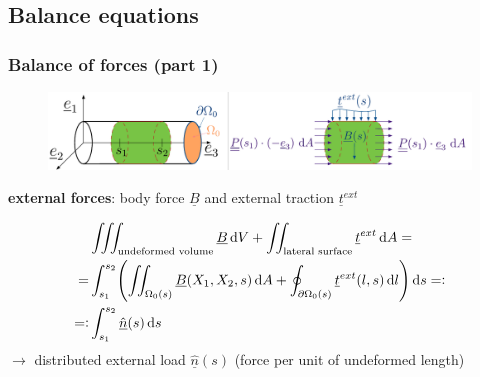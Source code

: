 \subsection{Balance equations}

\begin{frame}
  \frametitle{Balance of forces (part 1)}
  \begin{figure}
    \centering
    \includegraphics[width=22cm, keepaspectratio=true]{sections/cosserat_rods/images/Forces}
  \end{figure}

  \textbf{external forces}: body force $\underline{B}$ and external traction $\underline{t}^{ext}$
  
  \begin{displaymath}
    \begin{alignedat}{1}
      &\iiint_{\text{undeformed volume}} \underline{B} \dif V + \iint_{\text{lateral surface}} \underline{t}^{ext} \dif A = \\
      = &\int_{s_1}^{s_2} \Biggl( \iint_{\Omega_{0}(s)} \underline{B}(X_1,X_2,s) \dif A + \oint_{\partial \Omega_{0}(s)} \underline{t}^{ext}(l,s) \dif l \Biggr) \dif s =: \\
      =: & \int_{s_1}^{s_2} \underline{\hat{n}}(s) \dif s
    \end{alignedat}
  \end{displaymath}
  \vspace{0.5em}
  $\rightarrow$ distributed external load $\underline{\hat{n}}(s)$ (force per unit of undeformed length)
\end{frame}


